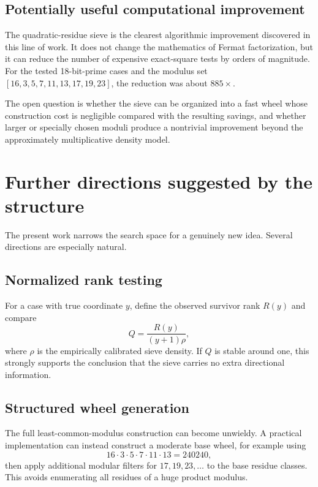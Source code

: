\documentclass[11pt,a4paper]{article}
\begin{document}
\subsection{Potentially useful computational improvement}
The quadratic-residue sieve is the clearest algorithmic improvement discovered in this line of work. It does not change the mathematics of Fermat factorization, but it can reduce the number of expensive exact-square tests by orders of magnitude. For the tested 18-bit-prime cases and the modulus set \([16,3,5,7,11,13,17,19,23]\), the reduction was about \(885\times\).

The open question is whether the sieve can be organized into a fast wheel whose construction cost is negligible compared with the resulting savings, and whether larger or specially chosen moduli produce a nontrivial improvement beyond the approximately multiplicative density model.

\section{Further directions suggested by the structure}
\label{sec:future}

The present work narrows the search space for a genuinely new idea. Several directions are especially natural.

\subsection{Normalized rank testing}
For a case with true coordinate \(y\), define the observed survivor rank \(R(y)\) and compare
\begin{equation}
Q=\frac{R(y)}{(y+1)\rho},
\end{equation}
where \(\rho\) is the empirically calibrated sieve density. If \(Q\) is stable around one, this strongly supports the conclusion that the sieve carries no extra directional information.

\subsection{Structured wheel generation}
The full least-common-modulus construction can become unwieldy. A practical implementation can instead construct a moderate base wheel, for example using
\[
16\cdot3\cdot5\cdot7\cdot11\cdot13=240240,
\]
then apply additional modular filters for \(17,19,23,\ldots\) to the base residue classes. This avoids enumerating all residues of a huge product modulus.
\end{document}
